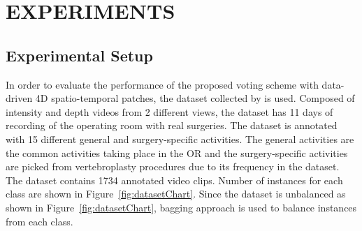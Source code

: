 \documentclass[a4paper, 10pt, conference]{ieeeconf}      %
\begin{document}
\section{EXPERIMENTS}
\label{section:experiments}


\subsection{Experimental Setup}
\label{section:experimentalSetup}

        In order to evaluate the performance of the proposed voting scheme with data-driven 4D spatio-temporal patches, the dataset collected by \cite{c1} is used. Composed of intensity and depth videos from 2 different views, the dataset has 11 days of recording of the operating room with real surgeries. The dataset is annotated with 15 different general and surgery-specific activities. 
        The general activities are the common activities taking place in the OR and
        the surgery-specific activities are picked from vertebroplasty procedures due to its frequency in the dataset. 
        The dataset contains 1734 annotated video clips. Number of instances for each class are shown in Figure~\ref{fig:datasetChart}. Since the dataset is unbalanced as shown in Figure~\ref{fig:datasetChart}, bagging approach is used to balance instances from each class.
\end{document}
